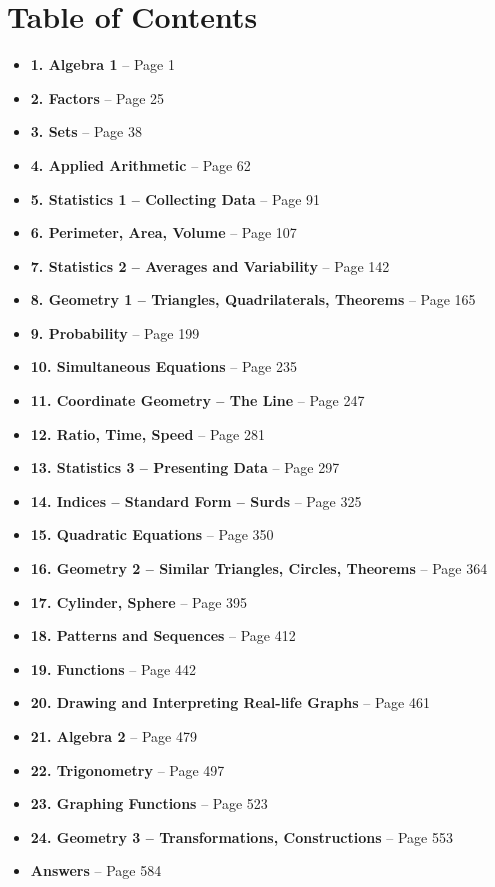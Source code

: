 \documentclass{article}
\begin{document}
\section*{Table of Contents}

\begin{itemize}
    \item \textbf{1. Algebra 1} -- Page 1
    \item \textbf{2. Factors} -- Page 25
    \item \textbf{3. Sets} -- Page 38
    \item \textbf{4. Applied Arithmetic} -- Page 62
    \item \textbf{5. Statistics 1 – Collecting Data} -- Page 91
    \item \textbf{6. Perimeter, Area, Volume} -- Page 107
    \item \textbf{7. Statistics 2 – Averages and Variability} -- Page 142
    \item \textbf{8. Geometry 1 – Triangles, Quadrilaterals, Theorems} -- Page 165
    \item \textbf{9. Probability} -- Page 199
    \item \textbf{10. Simultaneous Equations} -- Page 235
    \item \textbf{11. Coordinate Geometry – The Line} -- Page 247
    \item \textbf{12. Ratio, Time, Speed} -- Page 281
    \item \textbf{13. Statistics 3 – Presenting Data} -- Page 297
    \item \textbf{14. Indices – Standard Form – Surds} -- Page 325
    \item \textbf{15. Quadratic Equations} -- Page 350
    \item \textbf{16. Geometry 2 – Similar Triangles, Circles, Theorems} -- Page 364
    \item \textbf{17. Cylinder, Sphere} -- Page 395
    \item \textbf{18. Patterns and Sequences} -- Page 412
    \item \textbf{19. Functions} -- Page 442
    \item \textbf{20. Drawing and Interpreting Real-life Graphs} -- Page 461
    \item \textbf{21. Algebra 2} -- Page 479
    \item \textbf{22. Trigonometry} -- Page 497
    \item \textbf{23. Graphing Functions} -- Page 523
    \item \textbf{24. Geometry 3 – Transformations, Constructions} -- Page 553
    \item \textbf{Answers} -- Page 584
\end{itemize}
\end{document}

